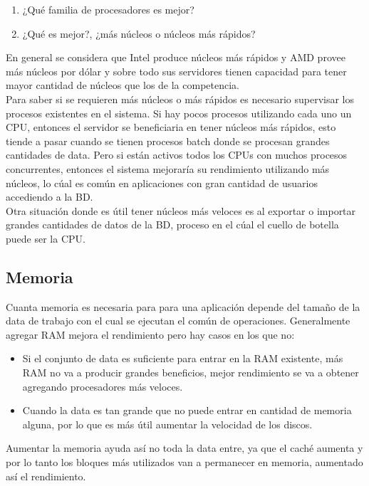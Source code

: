 \begin{enumerate}
\item ¿Qué familia de procesadores es mejor?
\item ¿Qué es mejor?, ¿más núcleos o núcleos más rápidos?
\end{enumerate}

En general se considera que Intel produce núcleos más rápidos y AMD provee más núcleos por dólar y sobre todo sus servidores tienen capacidad para tener mayor cantidad de núcleos que los de la competencia.\\

Para saber si se requieren más núcleos o más rápidos es necesario supervisar los procesos existentes en el sistema. Si hay pocos procesos utilizando cada uno un CPU, entonces el servidor se beneficiaria en  tener núcleos más rápidos, esto tiende a pasar cuando se tienen procesos batch donde se procesan grandes cantidades de data. Pero si están activos todos los CPUs con muchos procesos concurrentes, entonces el sistema mejoraría su rendimiento utilizando más núcleos, lo cúal es común en aplicaciones con gran cantidad de usuarios accediendo a la BD.\\

Otra situación donde es útil tener núcleos más veloces es al exportar o importar grandes cantidades de datos de la BD, proceso en el cúal el cuello de botella puede ser la CPU.

\subsection{Memoria}

Cuanta memoria es necesaria para para una aplicación depende del tamaño de la data de trabajo con el cual se ejecutan el común de operaciones. Generalmente agregar RAM mejora el rendimiento pero hay casos en los que no:

\begin{itemize}
\item Si el conjunto de data es suficiente para entrar en la RAM existente, más RAM no va a producir grandes beneficios, mejor rendimiento se va a obtener agregando procesadores más veloces.
\item Cuando la data es tan grande que no puede entrar en cantidad de memoria alguna, por lo que es más útil aumentar la velocidad de los discos.
\end{itemize}

Aumentar la memoria ayuda así no toda la data entre, ya que el caché aumenta y por lo tanto los bloques más utilizados van a permanecer en memoria, aumentado así el rendimiento.

